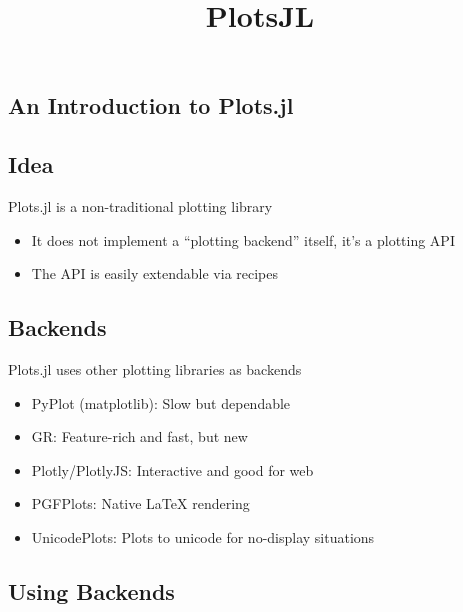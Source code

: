 \documentclass[11pt]{article}
\title{PlotsJL}
\providecommand{\tightlist}{%
      \setlength{\itemsep}{0pt}\setlength{\parskip}{0pt}}
\begin{document}
    
    
    \maketitle
    
    

    
    \hypertarget{an-introduction-to-plots.jl}{%
\subsection{An Introduction to
Plots.jl}\label{an-introduction-to-plots.jl}}

    \hypertarget{idea}{%
\subsection{Idea}\label{idea}}

Plots.jl is a non-traditional plotting library

\begin{itemize}
\tightlist
\item
  It does not implement a ``plotting backend'' itself, it's a plotting
  API
\item
  The API is easily extendable via recipes
\end{itemize}

    \hypertarget{backends}{%
\subsection{Backends}\label{backends}}

Plots.jl uses other plotting libraries as backends

\begin{itemize}
\tightlist
\item
  PyPlot (matplotlib): Slow but dependable
\item
  GR: Feature-rich and fast, but new
\item
  Plotly/PlotlyJS: Interactive and good for web
\item
  PGFPlots: Native LaTeX rendering
\item
  UnicodePlots: Plots to unicode for no-display situations
\end{itemize}

    \hypertarget{using-backends}{%
\subsection{Using Backends}\label{using-backends}}
\end{document}
